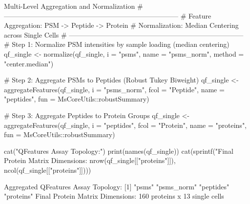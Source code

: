 \documentclass[11pt,twoside,openright]{book}
\begin{document}
\begin{rchunk}{Multi-Level Aggregation and Normalization}
# -----------------------------------------------------------------------------
# Feature Aggregation: PSM -> Peptide -> Protein
# Normalization: Median Centering across Single Cells
# -----------------------------------------------------------------------------
# Step 1: Normalize PSM intensities by sample loading (median centering)
qf_single <- normalize(qf_single,
                       i = "psms",
                       name = "psms_norm",
                       method = "center.median")

# Step 2: Aggregate PSMs to Peptides (Robust Tukey Biweight)
qf_single <- aggregateFeatures(qf_single,
                               i = "psms_norm",
                               fcol = "Peptide",
                               name = "peptides",
                               fun = MsCoreUtils::robustSummary)

# Step 3: Aggregate Peptides to Protein Groups
qf_single <- aggregateFeatures(qf_single,
                               i = "peptides",
                               fcol = "Protein",
                               name = "proteins",
                               fun = MsCoreUtils::robustSummary)

cat("\nAggregated QFeatures Assay Topology:\n")
print(names(qf_single))
cat(sprintf("Final Protein Matrix Dimensions: %
            nrow(qf_single[["proteins"]]), ncol(qf_single[["proteins"]])))
\end{rchunk}

\begin{routput}
Aggregated QFeatures Assay Topology:
{}[1] "psms"      "psms\_norm" "peptides"  "proteins" 
Final Protein Matrix Dimensions: 160 proteins x 13 single cells
\end{routput}

\end{document}
